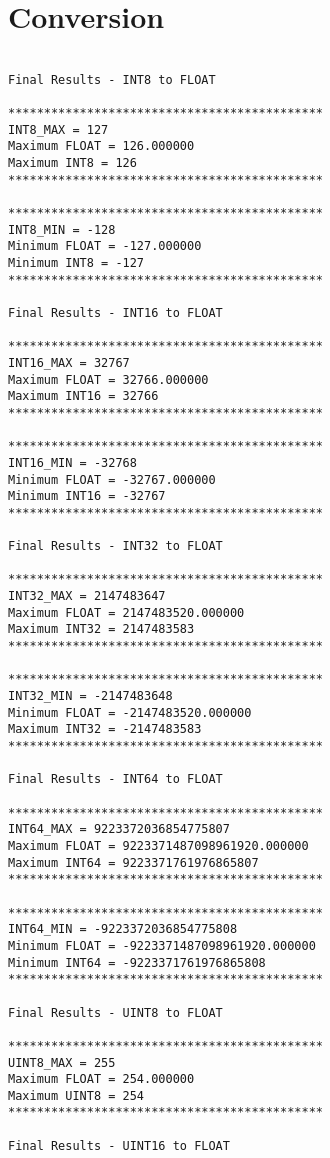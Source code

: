 \chapter{Conversion}

\begin{verbatim}

Final Results - INT8 to FLOAT

********************************************
INT8_MAX = 127
Maximum FLOAT = 126.000000
Maximum INT8 = 126
********************************************

********************************************
INT8_MIN = -128
Minimum FLOAT = -127.000000
Minimum INT8 = -127
********************************************

Final Results - INT16 to FLOAT

********************************************
INT16_MAX = 32767
Maximum FLOAT = 32766.000000
Maximum INT16 = 32766
********************************************

********************************************
INT16_MIN = -32768
Minimum FLOAT = -32767.000000
Minimum INT16 = -32767
********************************************

Final Results - INT32 to FLOAT

********************************************
INT32_MAX = 2147483647
Maximum FLOAT = 2147483520.000000
Maximum INT32 = 2147483583
********************************************

********************************************
INT32_MIN = -2147483648
Minimum FLOAT = -2147483520.000000
Maximum INT32 = -2147483583
********************************************

Final Results - INT64 to FLOAT

********************************************
INT64_MAX = 9223372036854775807
Maximum FLOAT = 9223371487098961920.000000
Maximum INT64 = 9223371761976865807
********************************************

********************************************
INT64_MIN = -9223372036854775808
Minimum FLOAT = -9223371487098961920.000000
Minimum INT64 = -9223371761976865808
********************************************

Final Results - UINT8 to FLOAT

********************************************
UINT8_MAX = 255
Maximum FLOAT = 254.000000
Maximum UINT8 = 254
********************************************

Final Results - UINT16 to FLOAT


\end{verbatim}
